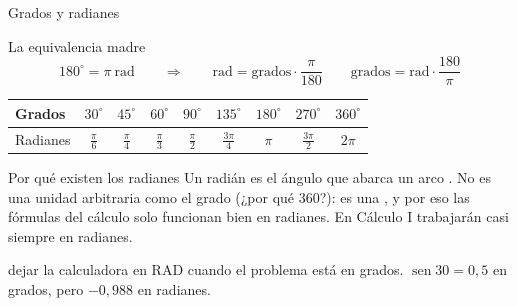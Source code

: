 \documentclass[aspectratio=169,10pt]{beamer}
\begin{document}
\begin{frame}{Grados y radianes}
  \scriptsize
  \begin{block}{La equivalencia madre}
    \scriptsize
    \[ 180^{\circ} = \pi \ \text{rad}
       \qquad\Longrightarrow\qquad
       \text{rad} = \text{grados}\cdot\frac{\pi}{180}
       \qquad
       \text{grados} = \text{rad}\cdot\frac{180}{\pi} \]
  \end{block}

  \vspace{0.1cm}
  \begin{center}
  \begin{tabular}{@{}lcccccccc@{}}
    \toprule
    Grados & $30^{\circ}$ & $45^{\circ}$ & $60^{\circ}$ & $90^{\circ}$ &
      $135^{\circ}$ & $180^{\circ}$ & $270^{\circ}$ & $360^{\circ}$ \\
    \midrule
    Radianes & $\frac{\pi}{6}$ & $\frac{\pi}{4}$ & $\frac{\pi}{3}$ &
      $\frac{\pi}{2}$ & $\frac{3\pi}{4}$ & $\pi$ & $\frac{3\pi}{2}$ &
      $2\pi$ \\
    \bottomrule
  \end{tabular}
  \end{center}

  \vspace{0.12cm}
  \begin{alertblock}{Por qué existen los radianes}
    \tiny
    Un radián es el ángulo que abarca un arco . No es una
    unidad arbitraria como el grado (¿por qué 360?): es una , y por eso las fórmulas del cálculo solo funcionan bien
    en radianes. En Cálculo I trabajarán casi siempre en radianes.
  \end{alertblock}

  \vspace{0.05cm}
  {\tiny\color{uniGris}  dejar la
  calculadora en RAD cuando el problema está en grados.
  $\operatorname{sen}30 = 0{,}5$ en grados, pero $-0{,}988$ en radianes.
  }
\end{frame}
\end{document}
